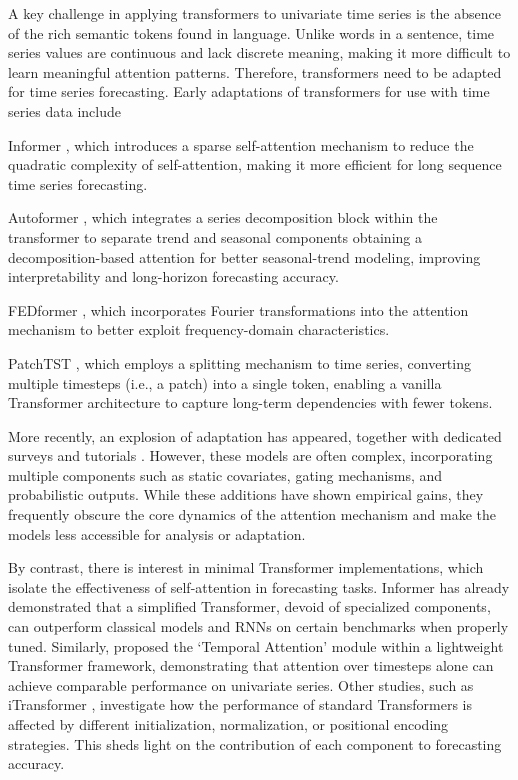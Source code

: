 \documentclass[algorithms,article,submit,pdftex,moreauthors]{Definitions/mdpi}
\begin{document}
A key challenge in applying transformers to univariate time series is the absence of the rich semantic tokens found in language. Unlike words in a sentence, time series values are continuous and lack discrete meaning, making it more difficult to learn meaningful attention patterns. Therefore, transformers need to be adapted for time series forecasting. Early adaptations of transformers for use with time series data include 

Informer \citep{ZZPZ21}, which introduces a sparse self-attention mechanism to reduce the quadratic complexity of self-attention, making it more efficient for long sequence time series forecasting.

Autoformer \citep{WXWL22}, which integrates a series decomposition block within the transformer to separate trend and seasonal components obtaining a decomposition-based attention for better seasonal-trend modeling, improving interpretability and long-horizon forecasting accuracy.

FEDformer \citep{ZMWW22}, which incorporates Fourier transformations into the attention mechanism to better exploit frequency-domain characteristics.

PatchTST \citep{patchTST}, which employs a splitting mechanism to time series, converting multiple timesteps (i.e., a patch) into a single token, enabling a vanilla Transformer architecture to capture long-term dependencies with fewer tokens. 

More recently, an explosion of adaptation has appeared, together with dedicated surveys and tutorials \cite{ WZZC23, ANTS23, SZLW25}. However, these models are often complex, incorporating multiple components such as static covariates, gating mechanisms, and probabilistic outputs. While these additions have shown empirical gains, they frequently obscure the core dynamics of the attention mechanism and make the models less accessible for analysis or adaptation.

By contrast, there is interest in minimal Transformer implementations, which isolate the effectiveness of self-attention in forecasting tasks. Informer has already demonstrated that a simplified Transformer, devoid of specialized components, can outperform classical models and RNNs on certain benchmarks when properly tuned. Similarly, \citep{LSNP21} proposed the `Temporal Attention' module within a lightweight Transformer framework, demonstrating that attention over timesteps alone can achieve comparable performance on univariate series. Other studies, such as iTransformer \cite{LHZW24}, investigate how the performance of standard Transformers is affected by different initialization, normalization, or positional encoding strategies. This sheds light on the contribution of each component to forecasting accuracy.
\end{document}
